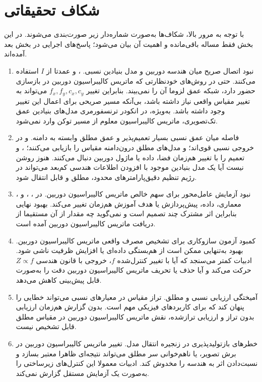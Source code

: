 \section{شکاف تحقیقاتی}
\label{sec:ch2_gap}
با توجه به مرور بالا، شکاف‌ها به‌صورت شماره‌دار زیر صورت‌بندی می‌شوند. در این بخش فقط مساله باقی‌مانده و اهمیت آن بیان می‌شود؛ پاسخ‌های اجرایی در بخش بعد آمده‌اند.

\begin{enumerate}
\item نبود اتصال صریح میان هندسه دوربین و مدل بنیادین نسبی. ،  و  عمدتا از $I$ استفاده می‌کنند. حتی در روش‌های خودنظارتی که ماتریس کالیبراسیون دوربین در بازسازی حضور دارد، شبکه عمق لزوما آن را نمی‌بیند. بنابراین تغییر $f_x,f_y,c_x,c_y$ می‌تواند به تغییر مقیاس واقعی نیاز داشته باشد، بی‌آنکه مسیر صریحی برای اعمال این تغییر وجود داشته باشد. به‌ویژه، در انکودر ترنسفورمری مدل‌های بنیادین عمق تک‌تصویری، ماتریس کالیبراسیون معلوم از مسیر توکن وارد نمی‌شود.
\item فاصله میان عمق نسبی بسیار تعمیم‌پذیر و عمق مطلق وابسته به دامنه.  و  در خروجی نسبی قوی‌اند؛  و مدل‌های مطلق درون‌دامنه مقیاس را بازیابی می‌کنند؛ ،  و  تعمیم را با تغییر هم‌زمان فضا، داده یا ماژول دوربین دنبال می‌کنند. هنوز روشن نیست آیا یک مدل بنیادین موجود با افزودن اطلاعات هندسی کم‌بعد می‌تواند در رژیم تنظیم دقیق‌پارامترهای محدود، مطلق و قابل انتقال شود.
\item نبود آزمایش عامل‌محور برای سهم خالص ماتریس کالیبراسیون دوربین. در ، ،  و ، معماری، داده، پیش‌پردازش یا هدف آموزش هم‌زمان تغییر می‌کند. بهبود نهایی بنابراین اثر مشترک چند تصمیم است و نمی‌گوید چه مقدار از آن مستقیما از دریافت ماتریس کالیبراسیون دوربین آمده است.
\item کمبود آزمون سازوکاری برای تشخیص مصرف واقعی ماتریس کالیبراسیون دوربین. بهبود  به‌تنهایی ممکن است از هم‌بستگی داده‌ای یا افزایش ظرفیت ناشی شود. ادبیات کمتر می‌سنجد که آیا با تغییر کنترل‌شده $f$، خروجی با قانون هندسی $Z\propto f$ حرکت می‌کند و آیا حذف یا تحریف ماتریس کالیبراسیون دوربین دقت را به‌صورت قابل پیش‌بینی کاهش می‌دهد.
\item آمیختگی ارزیابی نسبی و مطلق. تراز مقیاس در معیارهای نسبی می‌تواند خطایی را پنهان کند که برای کاربردهای فیزیکی مهم است. بدون گزارش هم‌زمان ارزیابی بدون تراز و ارزیابی تراز‌شده، نقش ماتریس کالیبراسیون دوربین در مقیاس مطلق قابل تشخیص نیست.
\item خطرهای بازتولیدپذیری در زنجیره انتقال مدل. تغییر ماتریس کالیبراسیون دوربین در برش تصویر، یا ناهم‌خوانی سر مطلق می‌تواند نتیجه‌ای ظاهرا معتبر بسازد و نسبت‌دادن اثر به هندسه را مخدوش کند. ادبیات معمولا این کنترل‌های زیرساختی را به‌صورت یک آزمایش مستقل گزارش نمی‌کند.
\end{enumerate}

